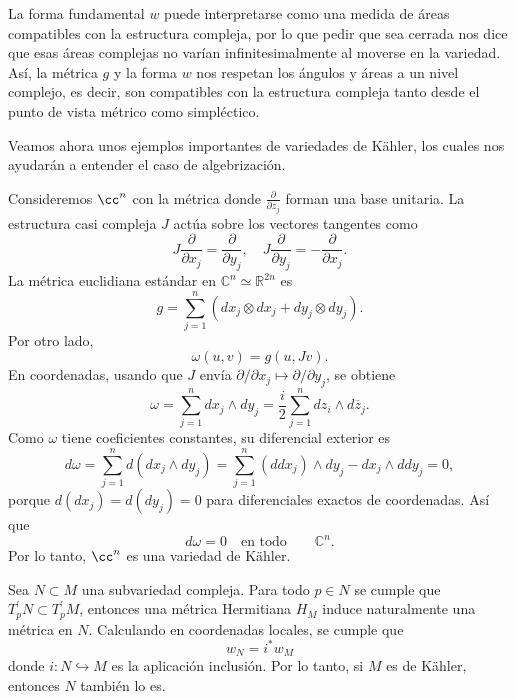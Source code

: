 La forma fundamental $w$ puede interpretarse como una medida de áreas compatibles con la estructura compleja, por lo que pedir que sea cerrada nos dice que esas áreas complejas no varían infinitesimalmente al moverse en la variedad. Así, la métrica $g$ y la forma $w$ nos respetan los ángulos y áreas a un nivel complejo, es decir, son compatibles con la estructura compleja tanto desde el punto de vista métrico como simpléctico.

Veamos ahora unos ejemplos importantes de variedades de Kähler, los cuales nos ayudarán a entender el caso de algebrización.

\begin{example}
	Consideremos $\cc^n$ con la métrica donde $\frac{\partial}{\partial z_j}$ forman una base unitaria. La estructura casi compleja $J$ actúa sobre los vectores tangentes como
	\begin{equation*}
		J\frac{\partial}{\partial x_j}=\frac{\partial}{\partial y_j},\quad
		J\frac{\partial}{\partial y_j}=-\frac{\partial}{\partial x_j}.
	\end{equation*}
	La métrica euclidiana estándar en $\mathbb{C}^n\simeq\mathbb{R}^{2n}$ es
	\begin{equation*}
		g=\sum_{j=1}^n (dx_j\otimes dx_j+dy_j\otimes dy_j).
	\end{equation*}
	Por otro lado,
	\begin{equation*}
		\omega(u,v)=g(u,Jv).
	\end{equation*}
	En coordenadas, usando que $J$ envía $\partial/\partial x_j\mapsto\partial/\partial y_j$, se obtiene
	\begin{equation*}
		\omega=\sum_{j=1}^n dx_j\wedge dy_j=\frac{i}{2}\sum_{j=1}^{n} dz_i\wedge d\overline{z}_j.
	\end{equation*}
	Como $\omega$ tiene coeficientes constantes, su diferencial exterior es
	\begin{equation*}
		d\omega=\sum_{j=1}^n d(dx_j\wedge dy_j)=
		\sum_{j=1}^n (d dx_j)\wedge dy_j - dx_j\wedge d dy_j=0,
	\end{equation*}
	porque $d (dx_j)=d (dy_j)=0$ para diferenciales exactos de coordenadas. Así que
	\begin{equation*}
		d\omega=0\quad\text{en todo}\qquad \mathbb{C}^n.
	\end{equation*}
	Por lo tanto, $\cc^n$ es una variedad de Kähler.
\end{example}

\begin{example}
	Sea $N\subset M$ una subvariedad compleja. Para todo $p\in N$ se cumple que $T_p^\prime N\subset T_p^\prime M$, entonces una métrica Hermitiana $H_M$ induce naturalmente una métrica en $N$. Calculando en coordenadas locales, se cumple que
	\begin{equation*}
		w_N=i^*w_M
	\end{equation*}
	donde $i:N\hookrightarrow M$ es la aplicación inclusión. Por lo tanto, si $M$ es de Kähler, entonces $N$ también lo es.
\end{example}

